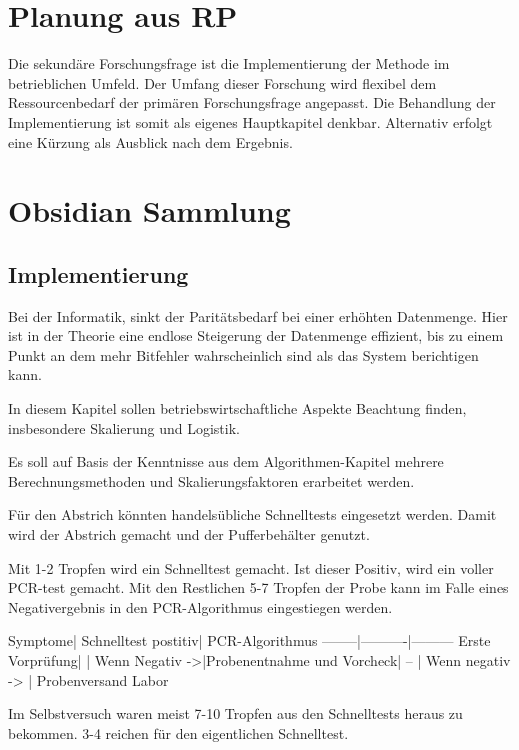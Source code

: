 \section{Planung aus RP}
Die sekundäre Forschungsfrage ist die Implementierung der Methode im betrieblichen Umfeld.
Der Umfang dieser Forschung wird flexibel dem Ressourcenbedarf der primären Forschungsfrage angepasst.
Die Behandlung der Implementierung ist somit als eigenes Hauptkapitel denkbar.
Alternativ erfolgt eine Kürzung als Ausblick nach dem Ergebnis.

\section{Obsidian Sammlung}
\subsection{Implementierung}
Bei der Informatik, sinkt der Paritätsbedarf bei einer erhöhten Datenmenge.
Hier ist in der Theorie eine endlose Steigerung der Datenmenge effizient, bis zu einem Punkt an dem mehr Bitfehler wahrscheinlich sind als das System berichtigen kann.

In diesem Kapitel sollen betriebswirtschaftliche Aspekte Beachtung finden, insbesondere Skalierung und Logistik.

Es soll auf Basis der Kenntnisse aus dem Algorithmen-Kapitel mehrere Berechnungsmethoden und Skalierungsfaktoren erarbeitet werden.

Für den Abstrich könnten handelsübliche Schnelltests eingesetzt werden. Damit wird der Abstrich gemacht und der Pufferbehälter genutzt.

Mit 1-2 Tropfen wird ein Schnelltest gemacht. Ist dieser Positiv, wird ein voller PCR-test gemacht. Mit den Restlichen 5-7 Tropfen der Probe kann im Falle eines Negativergebnis in den PCR-Algorithmus eingestiegen werden.

Symptome| Schnelltest postitiv| PCR-Algorithmus
--------|----------|---------
Erste Vorprüfung| |
Wenn Negativ ->|Probenentnahme und Vorcheck|
-- | Wenn negativ -> | Probenversand Labor

Im Selbstversuch waren meist 7-10 Tropfen aus den Schnelltests heraus zu bekommen. 3-4 reichen für den eigentlichen Schnelltest.
\fi